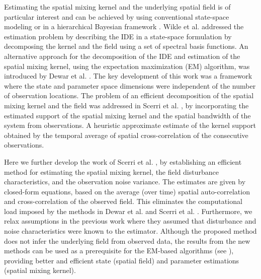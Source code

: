\documentclass[10pt,twocolumn,twoside]{IEEEtran}
\begin{document}
Estimating the spatial mixing kernel and the underlying spatial field is of particular interest and can be achieved by using conventional state-space modeling \cite{Dewar2009,Scerri2009} or in a hierarchical Bayesian framework \cite{Wikle1999,Xu2005,Wikle2011}. Wikle et al. \cite{Wikle2004} addressed the estimation problem by describing the IDE in a state-space formulation by decomposing the kernel and the field using a set of spectral basis functions. An alternative approach for the decomposition of the IDE and estimation of the spatial mixing kernel, using the expectation maximization (EM) algorithm, was introduced by Dewar et al. \cite{Dewar2009}. The key development of this work was a framework where the state and parameter space dimensions were independent of the number of observation locations. %
The problem of an efficient decomposition of the spatial mixing kernel and the field was addressed in Scerri et al. \cite{Scerri2009}, by incorporating the estimated support of the spatial mixing kernel and the spatial bandwidth of the system from observations. 
A heuristic approximate estimate of the kernel support obtained by the temporal average of spatial cross-correlation of the consecutive observations.  

Here we further develop the work of Scerri et al. \cite{Scerri2009}, by establishing an efficient method for estimating the spatial mixing kernel, the field disturbance characteristics, and the observation noise variance. The estimates are given by closed-form equations, based on the average (over time) spatial auto-correlation and cross-correlation of the observed field. This eliminates the computational load imposed by the methods in Dewar et al. and Scerri et al. \cite{Dewar2009,Scerri2009}. Furthermore, we relax assumptions in the previous work where they assumed that disturbance and noise characteristics were known to the estimator. Although the proposed method does not infer the underlying field from observed data, the results from the new methods can be used as a prerequisite for the EM-based algorithms (see \cite{Dewar2009,Xu2007}), providing better and efficient state (spatial field) and parameter estimations (spatial mixing kernel). 
\end{document}

